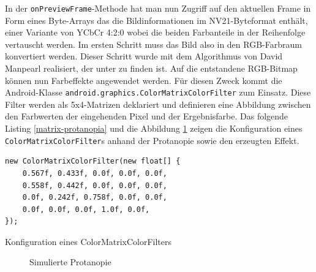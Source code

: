 \documentclass[a4paper]{article}
\begin{document}
In der \texttt{onPreviewFrame}-Methode hat man nun Zugriff auf den aktuellen Frame in Form eines Byte-Arrays das die Bildinformationen im NV21-Byteformat enthält, einer Variante von YCbCr 4:2:0 wobei die beiden Farbanteile in der Reihenfolge vertauscht werden. Im ersten Schritt muss das Bild also in den RGB-Farbraum konvertiert werden. Dieser Schritt wurde mit dem Algorithmus von David Manpearl realisiert, der unter \cite{ANDROID-YUV} zu finden ist. Auf die entstandene RGB-Bitmap können nun Farbeffekte angewendet werden. Für diesen Zweck kommt die Android-Klasse \texttt{android.graphics.ColorMatrixColorFilter} zum Einsatz. Diese Filter werden als 5x4-Matrizen deklariert und definieren eine Abbildung zwischen den Farbwerten der eingehenden Pixel und der Ergebnisfarbe. Das folgende Listing \ref{matrix-protanopia} und die Abbildung \ref{simulated-protanopia} zeigen die Konfiguration eines \texttt{ColorMatrixColorFilter}s anhand der Protanopie sowie den erzeugten Effekt.

\begin{listing}[H]
\begin{verbatim}
new ColorMatrixColorFilter(new float[] {
    0.567f, 0.433f, 0.0f, 0.0f, 0.0f,
    0.558f, 0.442f, 0.0f, 0.0f, 0.0f,
    0.0f, 0.242f, 0.758f, 0.0f, 0.0f,
    0.0f, 0.0f, 0.0f, 1.0f, 0.0f,
});
\end{verbatim}
\caption{Konfiguration eines ColorMatrixColorFilters}
\label{matrix-protanopia}
\end{listing}

\begin{figure}[H]
\centering
{}
\caption{Simulierte Protanopie}
\label{simulated-protanopia}
\end{figure}
\end{document}
